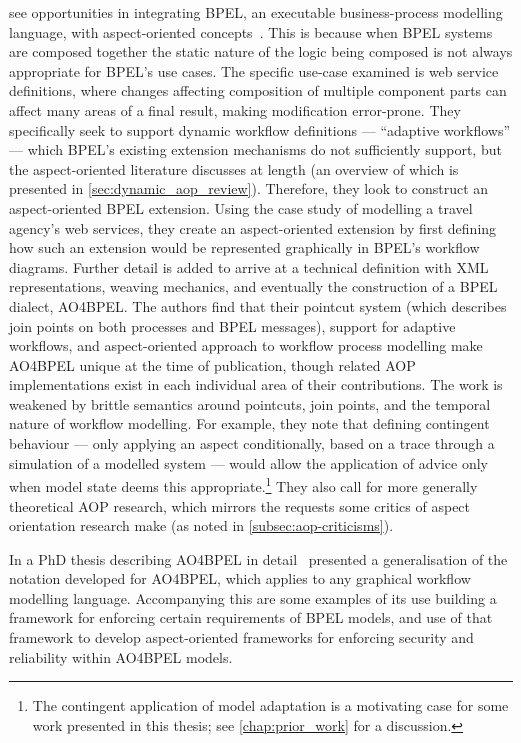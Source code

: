 \citeauthor{charfi2007ao4bpel} see opportunities in integrating BPEL, an
executable business-process modelling language, with aspect-oriented
concepts~\cite{charfi2007ao4bpel}. This is because when BPEL systems are
composed together the static nature of the logic being composed is not always
appropriate for BPEL's use cases. The specific use-case examined is web service
definitions, where changes affecting composition of multiple component parts can
affect many areas of a final result, making modification error-prone. They
specifically seek to support dynamic workflow definitions --- ``adaptive
workflows'' --- which BPEL's existing extension mechanisms do not sufficiently
support, but the aspect-oriented literature discusses at length (an overview of
which is presented in \cref{sec:dynamic_aop_review}). Therefore, they look to
construct an aspect-oriented BPEL extension. Using the case study of modelling a
travel agency's web services, they create an aspect-oriented extension by first
defining how such an extension would be represented graphically in BPEL's
workflow diagrams. Further detail is added to arrive at a technical definition
with XML representations, weaving mechanics, and eventually the construction of
a BPEL dialect, AO4BPEL. The authors find that their pointcut system (which
describes join points on both processes and BPEL messages), support for adaptive
workflows, and aspect-oriented approach to workflow process modelling make
AO4BPEL unique at the time of publication, though related AOP implementations
exist in each individual area of their contributions. The work is weakened by
brittle semantics around pointcuts, join points, and the temporal nature of
workflow modelling. For example, they note that defining contingent behaviour
--- only applying an aspect conditionally, based on a trace through a simulation
of a modelled system --- would allow the application of advice only when model
state deems this appropriate.\footnote{The contingent application of model
adaptation is a motivating case for some work presented in this thesis; see
\cref{chap:prior_work} for a discussion.} They also call for more generally
theoretical AOP research, which mirrors the requests some critics of aspect
orientation research make (as noted in \cref{subsec:aop-criticisms}).

In a PhD thesis describing AO4BPEL in detail~\cite{Charfi2006AspectOrientedWL}
\citeauthor{Charfi2006AspectOrientedWL} presented a generalisation of the
notation developed for AO4BPEL, which applies to any graphical workflow
modelling language. Accompanying this are some examples of its use building a
framework for enforcing certain requirements of BPEL models, and use of that
framework to develop aspect-oriented frameworks for enforcing security and
reliability within AO4BPEL models.

